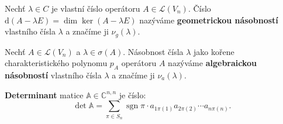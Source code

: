 \documentclass{szzclass}
\DeclareMathOperator{\sgn}{sgn}
\newcommand{\defect}[1]{\text{d} #1}
\begin{document}
\begin{definition}
Nechť $\lambda \in C$ je vlastní číslo operátoru $A \in \mathcal{L}(V_n)$. Číslo $\defect{(A -
\lambda E)} = \dim{\ker{(A-\lambda E)}}$ nazýváme \textbf{geometrickou násobností} vlastního čísla $\lambda$
a značíme ji $\nu_g(\lambda)$.
\end{definition}

\begin{definition}
Nechť $A \in \mathcal{L}(V_n)$ a $\lambda \in \sigma(A)$. Násobnost čísla $\lambda$ jako kořene charakteristického polynomu $p_A$ operátoru $A$ nazýváme \textbf{algebraickou násobností} vlastního čísla $\lambda$ a značíme ji $\nu_a(\lambda )$.
\end{definition}


\begin{definition}[determinant]
\textbf{Determinant} matice $\mathbb{A}\in \mathbb{C}^{n,n}$ je číslo:
\[
  \det{\mathbb{A}} = \sum_{\pi\in S_n} \sgn\pi \cdot a_{1\pi(1)} a_{2\pi(2)} \cdots a_{n\pi(n)}.
\]
\end{definition}
\end{document}
